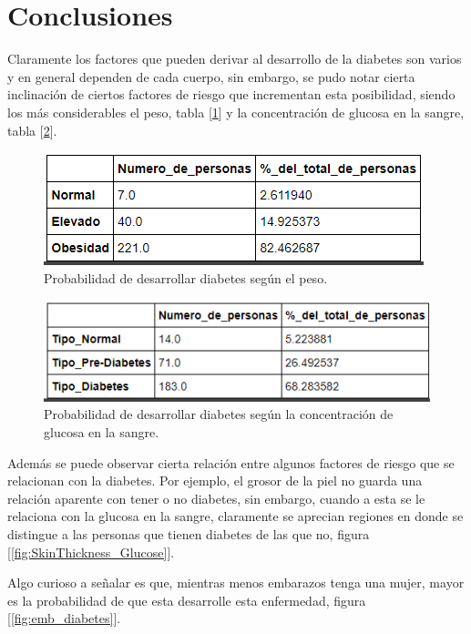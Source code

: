 \documentclass{article}
\begin{document}
\section{Conclusiones}

Claramente los factores que pueden derivar al desarrollo de la diabetes son varios y en general dependen de cada cuerpo, sin embargo, se pudo notar cierta inclinación de ciertos factores de riesgo que incrementan esta posibilidad, siendo los más considerables el peso, tabla [\ref{fig:porc_peso}] y la concentración de glucosa en la sangre, tabla [\ref{fig:porc_glucosa}].

\begin{figure}[H]
	\centering
	\includegraphics[width=0.9\linewidth]{porc_peso.png}
	\caption{Probabilidad de desarrollar diabetes según el peso.}%
	\label{fig:porc_peso}
\end{figure}

\begin{figure}[H]
	\centering
	\includegraphics[width=0.9\linewidth]{gluc.png}
	\caption{Probabilidad de desarrollar diabetes según la concentración de glucosa en la sangre.}%
	\label{fig:porc_glucosa}
\end{figure}

Además se puede observar cierta relación entre algunos factores de riesgo que se relacionan con la diabetes. Por ejemplo, el grosor de la piel no guarda una relación aparente con tener o no diabetes, sin embargo, cuando a esta se le relaciona con la glucosa en la sangre, claramente se aprecian regiones en donde se distingue a las personas que tienen diabetes de las que no, figura [\ref{fig:SkinThickness_Glucose}].



Algo curioso a señalar es que, mientras menos embarazos tenga una mujer, mayor es la probabilidad de que esta desarrolle esta enfermedad, figura [\ref{fig:emb_diabetes}].
\end{document}
